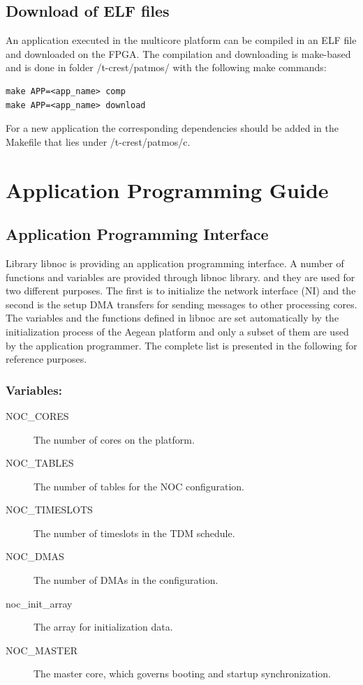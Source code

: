 \documentclass[a4paper,fontsize=10pt,twoside,DIV15,BCOR12mm,headinclude=true,footinclude=false,pagesize,bibtotoc]{scrbook}
\begin{document}
\subsection{Download of ELF files}

An application executed in the multicore platform can be compiled in an ELF file and downloaded on the FPGA.
The compilation and downloading is make-based and is done in folder /t-crest/patmos/ with the following make commands:

\begin{verbatim}
make APP=<app_name> comp
make APP=<app_name> download
\end{verbatim}

For a new application the corresponding dependencies should be added in the Makefile that
lies under /t-crest/patmos/c.



\section{Application Programming Guide}
\label{sec:apg}

\subsection{Application Programming Interface}

Library libnoc is providing an application programming interface. A number of functions and variables are provided through libnoc library. 
and they are used for two different purposes. The first is to initialize the network interface (NI) and the second is the setup DMA transfers 
for sending messages to other processing cores. The variables and the functions defined in libnoc are set automatically by the initialization process 
of the Aegean platform and only a subset of them are used by the application programmer. The complete list is presented in the following for reference
purposes.


\subsubsection{Variables:}
\begin{description}
\item[NOC\_CORES] The number of cores on the platform. 
\item[NOC\_TABLES] The number of tables for the NOC configuration.
\item[NOC\_TIMESLOTS] The number of timeslots in the TDM schedule. 
\item[NOC\_DMAS]	The number of DMAs in the configuration. 
\item[noc\_init\_array] The array for initialization data. 
\item[NOC\_MASTER] The master core, which governs booting and startup synchronization. 
\end{description}
\end{document}

